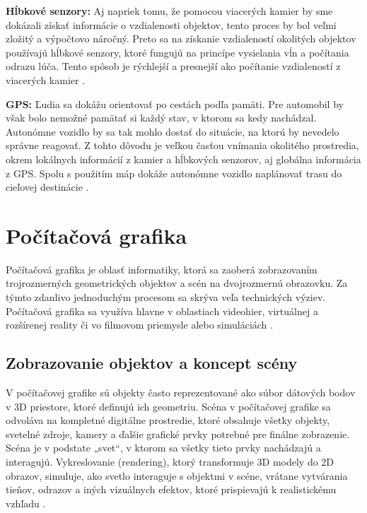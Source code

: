 \textbf{Hĺbkové senzory:} Aj napriek tomu, že pomocou viacerých kamier by sme dokázali získať informácie o vzdialenosti objektov, tento proces by bol veľmi zložitý a výpočtovo náročný. Preto sa na získanie vzdialeností okolitých objektov používajú hĺbkové senzory, ktoré fungujú na princípe vysielania vĺn a počítania odrazu lúča. Tento spôsob je rýchlejší a presnejší ako počítanie vzdialeností z viacerých kamier \cite{end_to_end_self_driving}.

\textbf{GPS:} Ľudia sa dokážu orientovať po cestách podľa pamäti. Pre automobil by však bolo nemožné pamätať si každý stav, v ktorom sa kedy nachádzal. Autonómne vozidlo by sa tak mohlo dostať do situácie, na ktorú by nevedelo správne reagovať. Z tohto dôvodu je veľkou časťou vnímania okolitého prostredia, okrem lokálnych informácií z kamier a hĺbkových senzorov, aj globálna informácia z GPS. Spolu s použitím máp dokáže autonómne vozidlo naplánovať trasu do cieľovej destinácie \cite{end_to_end_self_driving}.

\section{Počítačová grafika}
\label{sec:grafika}

Počítačová grafika je oblasť informatiky, ktorá sa zaoberá zobrazovaním trojrozmerných geometrických objektov a scén na dvojrozmernú obrazovku. Za týmto zdanlivo jednoduchým procesom sa skrýva veľa technických výziev. Počítačová grafika sa využíva hlavne v oblastiach videohier, virtuálnej a rozšírenej reality či vo filmovom priemysle alebo simuláciách \cite{computer_graphics}. 

\subsection{Zobrazovanie objektov a koncept scény}

V počítačovej grafike sú objekty často reprezentované ako súbor dátových bodov v 3D priestore, ktoré definujú ich geometriu. Scéna v počítačovej grafike sa odvoláva na kompletné digitálne prostredie, ktoré obsahuje všetky objekty, svetelné zdroje, kamery a ďalšie grafické prvky potrebné pre finálne zobrazenie. Scéna je v podstate „svet“, v ktorom sa všetky tieto prvky nachádzajú a interagujú. Vykreslovanie (rendering), ktorý transformuje 3D modely do 2D obrazov, simuluje, ako svetlo interaguje s objektmi v scéne, vrátane vytvárania tieňov, odrazov a iných vizuálnych efektov, ktoré prispievajú k realistickému vzhľadu \cite{computer_graphics}.

